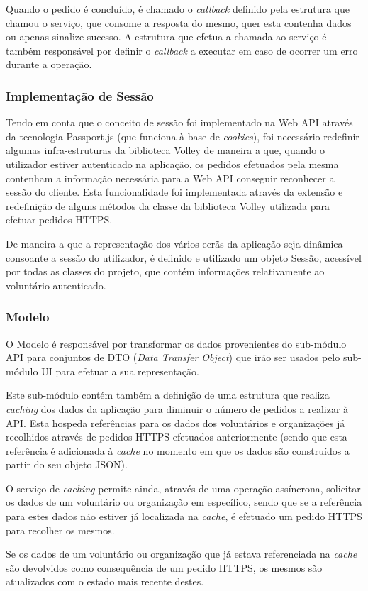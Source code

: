 \medskip

Quando o pedido é concluído, é chamado o \textit{callback} definido pela estrutura que chamou o serviço, que consome a resposta do mesmo, quer esta contenha dados ou apenas sinalize sucesso. A estrutura que efetua a chamada ao serviço é também responsável por definir o \textit{callback} a executar em caso de ocorrer um erro durante a operação.


\subsubsection{Implementação de Sessão}

Tendo em conta que o conceito de sessão foi implementado na Web API através da tecnologia Passport.js (que funciona à base de \textit{cookies}), foi necessário redefinir algumas infra-estruturas da biblioteca Volley de maneira a que, quando o utilizador estiver autenticado na aplicação, os pedidos efetuados pela mesma contenham a informação necessária para a Web API conseguir reconhecer a sessão do cliente. Esta funcionalidade foi implementada através da extensão e redefinição de alguns métodos da classe da biblioteca Volley utilizada para efetuar pedidos HTTPS.

\medskip

De maneira a que a representação dos vários ecrãs da aplicação seja dinâmica consoante a sessão do utilizador, é definido e utilizado um objeto Sessão, acessível por todas as classes do projeto, que contém informações relativamente ao voluntário autenticado.

\subsubsection{Modelo}

O Modelo é responsável por transformar os dados provenientes do sub-módulo API para conjuntos de DTO (\textit{Data Transfer Object}) que irão ser usados pelo sub-módulo UI para efetuar a sua representação.

\medskip

Este sub-módulo contém também a definição de uma estrutura que realiza \textit{caching} dos dados da aplicação para diminuir o número de pedidos a realizar à API. Esta hospeda referências para os dados dos voluntários e organizações já recolhidos através de pedidos HTTPS efetuados anteriormente (sendo que esta referência é adicionada à \textit{cache} no momento em que os dados são construídos a partir do seu objeto JSON). 

\par \medskip

O serviço de \textit{caching} permite ainda, através de uma operação assíncrona, solicitar os dados de um voluntário ou organização em específico, sendo que se a referência para estes dados não estiver já localizada na \textit{cache}, é efetuado um pedido HTTPS para recolher os mesmos. 

\par \medskip

Se os dados de um voluntário ou organização que já estava referenciada na \textit{cache} são devolvidos como consequência de um pedido HTTPS, os mesmos são atualizados com o estado mais recente destes.
